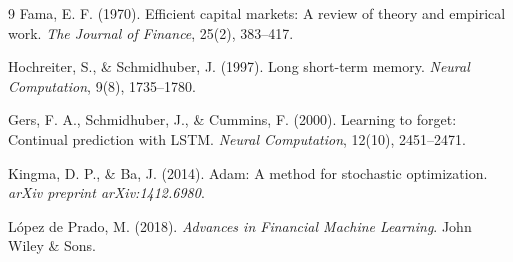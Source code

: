 \documentclass[11pt,letterpaper]{article}
\begin{document}
\vspace{0.4cm}
\begin{thebibliography}{9}
Fama, E. F. (1970). Efficient capital markets: A review of theory and empirical work. \textit{The Journal of Finance}, 25(2), 383--417.

Hochreiter, S., \& Schmidhuber, J. (1997). Long short-term memory. \textit{Neural Computation}, 9(8), 1735--1780.

Gers, F. A., Schmidhuber, J., \& Cummins, F. (2000). Learning to forget: Continual prediction with LSTM. \textit{Neural Computation}, 12(10), 2451--2471.

Kingma, D. P., \& Ba, J. (2014). Adam: A method for stochastic optimization. \textit{arXiv preprint arXiv:1412.6980}.

López de Prado, M. (2018). \textit{Advances in Financial Machine Learning}. John Wiley \& Sons.
\end{thebibliography}
\end{document}
